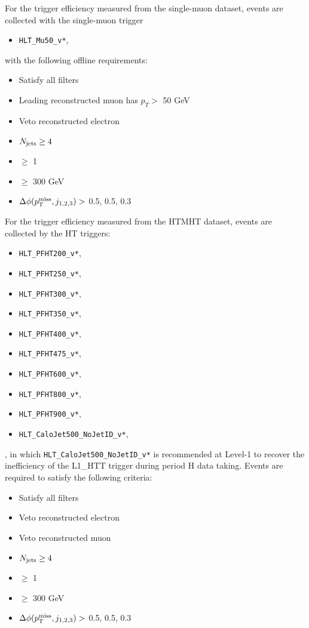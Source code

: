 For the \MET trigger efficiency measured from the single-muon dataset, events are collected with the single-muon trigger
\begin{itemize}
  \item \texttt{HLT\_Mu50\_v*},
\end{itemize}
with the following offline requirements:
\begin{itemize}
  \item Satisfy all filters
	\item Leading reconstructed muon has $p_{T}>$ 50 GeV
  \item Veto reconstructed electron
  \item $N_{\text{jets}}\geq4$
  \item \nbjets $\ge$ 1
  \item \HT $\ge$ 300 GeV
  \item $\Delta\phi(p^{\rm miss}_{\rm T}, j_{1,2,3})>$ 0.5, 0.5, 0.3
\end{itemize}
For the \MET trigger efficiency measured from the HTMHT dataset, events are collected by the HT triggers: 
\begin{itemize}
  \item \texttt{HLT\_PFHT200\_v*},
  \item \texttt{HLT\_PFHT250\_v*},
  \item \texttt{HLT\_PFHT300\_v*},
  \item \texttt{HLT\_PFHT350\_v*},
  \item \texttt{HLT\_PFHT400\_v*},
  \item \texttt{HLT\_PFHT475\_v*},
  \item \texttt{HLT\_PFHT600\_v*},
  \item \texttt{HLT\_PFHT800\_v*},
  \item \texttt{HLT\_PFHT900\_v*},
  \item \texttt{HLT\_CaloJet500\_NoJetID\_v*},
\end{itemize} 
, in which \texttt{HLT\_CaloJet500\_NoJetID\_v*} is recommended at Level-1 to recover the inefficiency of the L1\_HTT trigger during period H data taking. Events are required to satisfy the following criteria:
\begin{itemize}
  \item Satisfy all filters
  \item Veto reconstructed electron
  \item Veto reconstructed muon
  \item $N_{\text{jets}}\geq4$
  \item \nbjets $\ge$ 1
  \item \HT $\ge$ 300 GeV
  \item $\Delta\phi(p^{\rm miss}_{\rm T}, j_{1,2,3})>$ 0.5, 0.5, 0.3
\end{itemize}

